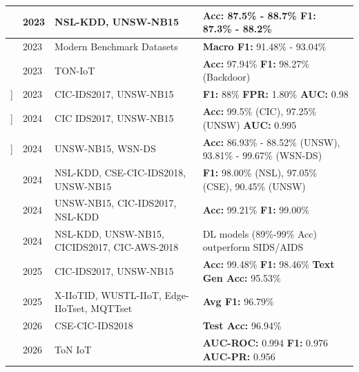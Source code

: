 \documentclass[12pt, a4paper]{report}
\begin{document}
\begin{longtable}{|p{3cm}|p{1.5cm}|p{4cm}|p{5cm}|}
\cite{liu2023intrusion} & 2023 & NSL-KDD, UNSW-NB15 & \textbf{Acc:} 87.5\% - 88.7\% \newline \textbf{F1:} 87.3\% - 88.2\% \\ \hline

\cite{caville2023anomal} & 2023 & Modern Benchmark Datasets & \textbf{Macro F1:} 91.48\% - 93.04\% \\ \hline

\cite{hairab2023anomaly} & 2023 & TON-IoT & \textbf{Acc:} 97.94\% \newline \textbf{F1:} 98.27\% (Backdoor) \\ \hline

\cite{appani2023selfsupervised}] & 2023 & CIC-IDS2017, UNSW-NB15 & \textbf{F1:} 88\% \newline \textbf{FPR:} 1.80\% \newline \textbf{AUC:} 0.98 \\ \hline

\cite{he2024network}] & 2024 & CIC IDS2017, UNSW-NB15 & \textbf{Acc:} 99.5\% (CIC), 97.25\% (UNSW) \newline \textbf{AUC:} 0.995 \\ \hline

\cite{abed2024modified}] & 2024 & UNSW-NB15, WSN-DS & \textbf{Acc:} 86.93\% - 88.52\% (UNSW), 93.81\% - 99.67\% (WSN-DS) \\ \hline

\cite{manocchio2024flowtransformer} & 2024 & NSL-KDD, CSE-CIC-IDS2018, UNSW-NB15 & \textbf{F1:} 98.00\% (NSL), 97.05\% (CSE), 90.45\% (UNSW) \\ \hline

\cite{ullah2024ids} & 2024 & UNSW-NB15, CIC-IDS2017, NSL-KDD & \textbf{Acc:} 99.21\% \newline \textbf{F1:} 99.00\% \\ \hline

\cite{armijos2024zeroday}  & 2024 & NSL-KDD, UNSW-NB15, CICIDS2017, CIC-AWS-2018 & DL models (89\%-99\% Acc) outperform SIDS/AIDS \\ \hline

\cite{rajkumardheivanayahi2025explainability}  & 2025 & CIC-IDS2017, UNSW-NB15 & \textbf{Acc:} 99.48\% \newline \textbf{F1:} 98.46\% \newline \textbf{Text Gen Acc:} 95.53\% \\ \hline

\cite{safe2025} & 2025 & X-IIoTID, WUSTL-IIoT, Edge-IIoTset, MQTTset & \textbf{Avg F1:} 96.79\% \\ \hline

\cite{appiahene2026network} & 2026 & CSE-CIC-IDS2018 & \textbf{Test Acc:} 96.94\% \\ \hline

\cite{nayak2026threatformer} & 2026 & ToN IoT & \textbf{AUC-ROC:} 0.994 \newline \textbf{F1:} 0.976 \newline \textbf{AUC-PR:} 0.956 \\ \hline

\end{longtable}
\end{document}
